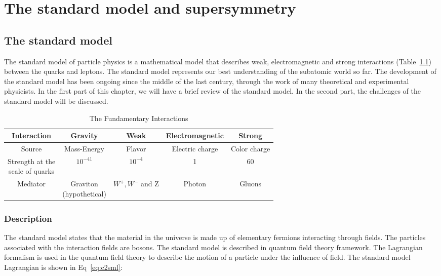 \chapter{The standard model and supersymmetry}
\clearpage
\section{The standard model}
The standard model of particle physics is a mathematical model that describes weak, electromagnetic and strong interactions (Table~\ref{tab:c24ei}) between the quarks and leptons. The standard model represents our best understanding of the subatomic world so far. The development of the standard model has been ongoing since the middle of the last century, through the work of many theoretical and experimental physicists. In the first part of this chapter, we will have a brief review of the standard model. In the second part, the challenges of the standard model will be discussed. 

\begin{table}[htbp]
\fontsize{10 pt}{1.2 em}
\selectfont
\begin{centering}
\caption{\label{tab:c24ei} The Fundamentary Interactions}
\hspace*{-4ex}
\begin{tabular}{|c|c|c|c|c|}
\hline
Interaction                                      & Gravity & Weak & Electromagnetic & Strong \\
\hline
Source                                           & Mass-Energy & Flavor & Electric charge & Color charge \\
\hline
\specialcell{Strength at the \\ scale of quarks} & $10^{-41}$ & $10^{-4}$ & 1 & 60 \\
\hline
Mediator                                         & \specialcell{Graviton\\(hypothetical)} & $W^{+},W^{-}$ and Z & Photon & Gluons \\
\hline
\end{tabular}
\par\end{centering}
\end{table}

\clearpage
\subsection{Description}

The standard model states that the material in the universe is made up of elementary fermions interacting through fields. The particles associated with the interaction fields are bosons. The standard model is described in quantum field theory framework. The Lagrangian formalism is used in the quantum field theory to describe the motion of a particle under the influence of field. The standard model Lagrangian is shown in Eq~\ref{eq:c2sml}: 

